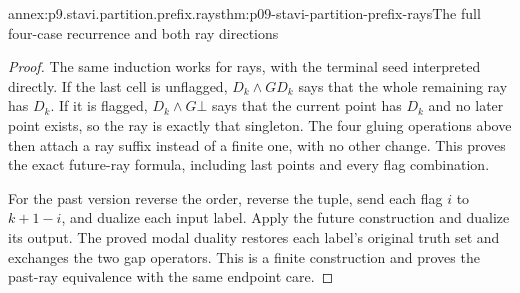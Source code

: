 \begin{annexitem}{annex:p9.stavi.partition.prefix.rays}{thm:p09-stavi-partition-prefix-rays}{The full four-case recurrence and both ray directions}
\begin{proof}
The same induction
works for rays,
with the terminal
seed interpreted
directly. If the
last cell is
unflagged, \(D_k\land GD_k\)
says that the
whole remaining
ray has \(D_k\).
If it is flagged,
\(D_k\land G\bot\)
says that the
current point has
\(D_k\) and no
later point exists,
so the ray is
exactly that
singleton. The
four gluing
operations above
then attach a
ray suffix instead
of a finite one,
with no other
change. This
proves the exact
future-ray formula,
including last
points and every
flag combination.

For the past
version reverse
the order, reverse
the tuple, send
each flag \(i\)
to \(k+1-i\),
and dualize each
input label.
Apply the future
construction and
dualize its output.
The proved modal
duality restores
each label's
original truth
set and exchanges
the two gap
operators.
This is a
finite construction
and proves the
past-ray equivalence
with the same
endpoint care.
\end{proof}
\end{annexitem}

